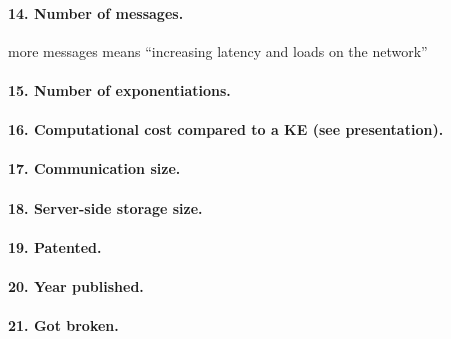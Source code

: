 ﻿\documentclass[../report.tex]{subfiles}
\begin{document}
\paragraph{14. Number of messages.}
more messages means ``increasing latency and loads on the network''

\paragraph{15. Number of exponentiations.}

\paragraph{16. Computational cost compared to a KE (see \cite{KHAPE_Paper} presentation).}

\paragraph{17. Communication size.}

\paragraph{18. Server-side storage size.}

\paragraph{19. Patented.}

\paragraph{20. Year published.}

\paragraph{21. Got broken.}
\end{document}
